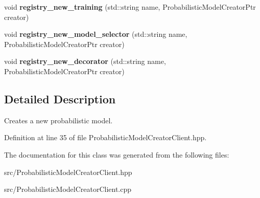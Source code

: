 \begin{DoxyCompactItemize}
\item 
\mbox{\label{classtops_1_1ProbabilisticModelCreatorClient_a0b6681510f4448756fa0950c66c4964f}} 
void {\bfseries registry\+\_\+new\+\_\+training} (std\+::string name, Probabilistic\+Model\+Creator\+Ptr creator)
\item 
\mbox{\label{classtops_1_1ProbabilisticModelCreatorClient_a071ce848362b2dc58ec07fadfa00518a}} 
void {\bfseries registry\+\_\+new\+\_\+model\+\_\+selector} (std\+::string name, Probabilistic\+Model\+Creator\+Ptr creator)
\item 
\mbox{\label{classtops_1_1ProbabilisticModelCreatorClient_a998237a85b601dd57ef37944e239a395}} 
void {\bfseries registry\+\_\+new\+\_\+decorator} (std\+::string name, Probabilistic\+Model\+Creator\+Ptr creator)
\end{DoxyCompactItemize}


\subsection{Detailed Description}
Creates a new probabilistic model. 

Definition at line 35 of file Probabilistic\+Model\+Creator\+Client.\+hpp.



The documentation for this class was generated from the following files\+:\begin{DoxyCompactItemize}
\item 
src/Probabilistic\+Model\+Creator\+Client.\+hpp\item 
src/Probabilistic\+Model\+Creator\+Client.\+cpp\end{DoxyCompactItemize}
